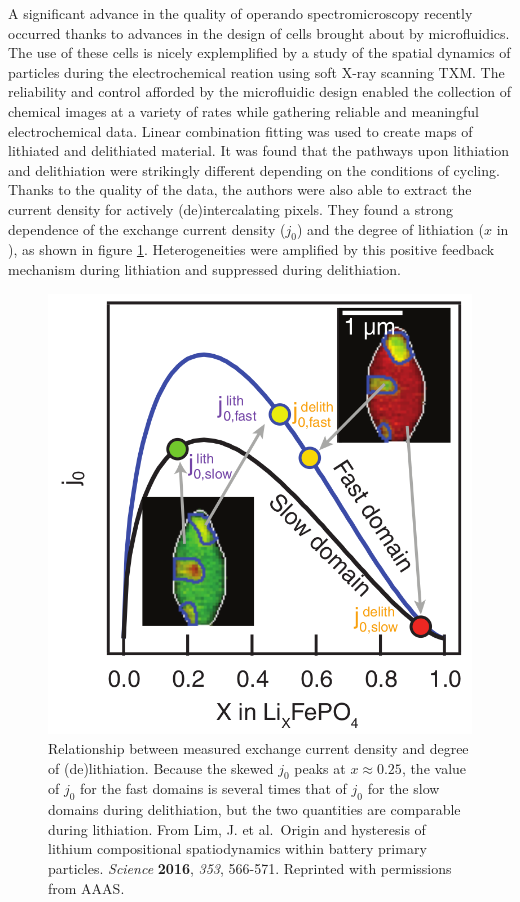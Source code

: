 \documentclass[journal=cmatex,manuscript=perspective]{achemso}
\begin{document}
A significant advance in the quality of operando spectromicroscopy
recently occurred thanks to advances in the design of cells brought
about by microfluidics. The use of these cells is nicely explemplified
by a study of the spatial dynamics of  particles during
the electrochemical reation using soft X-ray scanning
TXM\cite{lim2016}. The reliability and control afforded by the
microfluidic design enabled the collection of chemical images at a
variety of rates while gathering reliable and meaningful
electrochemical data. Linear combination fitting was used to create
maps of lithiated and delithiated material. It was found that the
pathways upon lithiation and delithiation were strikingly different
depending on the conditions of cycling. Thanks to the quality of the
data, the authors were also able to extract the current density for
actively (de)intercalating pixels. They found a strong dependence of
the exchange current density ($j_0$) and the degree of lithiation ($x$
in ), as shown in figure
\ref{figure:lim2016}. Heterogeneities were amplified by this positive
feedback mechanism during lithiation and suppressed during
delithiation.

\begin{figure}
  \includegraphics[width=\textwidth]{lim2016.png}
  \caption{Relationship between measured exchange current density and
    degree of (de)lithiation. Because the skewed $j_0$ peaks at $x
    \approx 0.25$, the value of $j_0$ for the fast domains is several
    times that of $j_0$ for the slow domains during delithiation, but
    the two quantities are comparable during lithiation. From Lim,
    J. et al.\ Origin and hysteresis of lithium compositional
    spatiodynamics within battery primary particles. \textit{Science}
    \textbf{2016}, \textit{353}, 566-571. Reprinted with permissions
    from AAAS.}
  \label{figure:lim2016}
\end{figure}
\end{document}
